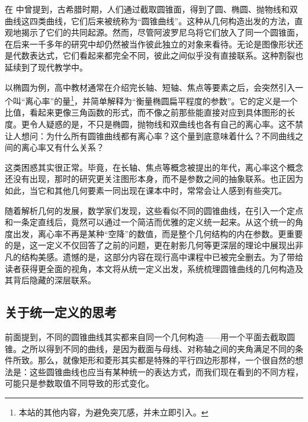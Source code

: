
\begin{issues}
\issueDraft
\end{issues}


在 中曾提到，古希腊时期，人们通过截取圆锥面，得到了圆、椭圆、抛物线和双曲线这四类曲线，它们后来被统称为“圆锥曲线”。这种从几何构造出发的方法，直观地揭示了它们的共同起源。然而，尽管阿波罗尼乌将它们放入了同一个圆锥面，在后来一千多年的研究中却仍然被当作彼此独立的对象来看待。无论是图像形状还是代数表达式，它们看起来都完全不同，彼此之间似乎没有直接联系。这种割裂也延续到了现代教学中。

以椭圆为例，高中教材通常在介绍完长轴、短轴、焦点等要素之后，会突然引入一个叫“离心率”的量\footnote{本站的其他内容，为避免突兀感，并未立即引入。}，并简单解释为“衡量椭圆扁平程度的参数”。它的定义是一个比值，看起来更像三角函数的形式，而不像之前那些能直接对应到具体图形的长度。更令人疑惑的是，不只是椭圆，抛物线和双曲线也各有自己的离心率。这不禁让人想问：为什么所有圆锥曲线都有离心率？这个量到底意味着什么？不同曲线之间的离心率又有什么关系？

这类困惑其实很正常。毕竟，在长轴、焦点等概念被提出的年代，离心率这个概念还没有出现，那时的研究更关注图形本身，而不是参数之间的抽象联系。也正因为如此，当它和其他几何要素一同出现在课本中时，常常会让人感到有些突兀。

随着解析几何的发展，数学家们发现，这些看似不同的圆锥曲线，在引入一个定点和一条定直线后，竟然可以通过一个简洁而优雅的定义统一起来。从这个统一的角度出发，离心率不再是某种“空降”的数值，而是整个几何结构的内在参数。更重要的是，这一定义不仅回答了之前的问题，更在射影几何等更深层的理论中展现出非凡的结构美感。遗憾的是，这部分内容在现行高中课程中已被完全删去。为了带给读者获得更全面的视角，本文将从统一定义出发，系统梳理圆锥曲线的几何构造及其背后隐藏的深层联系。


\subsection{关于统一定义的思考}

前面提到，不同的圆锥曲线其实都来自同一个几何构造——用一个平面去截取圆锥。之所以得到不同的曲线，是因为截面与母线、对称轴之间的夹角满足不同的条件所致。那么，就像矩形和菱形其实都是特殊的平行四边形那样，一个很自然的想法是：这些圆锥曲线也应当有某种统一的表达方式，而我们现在看到的不同方程，可能只是参数取值不同导致的形式变化。



